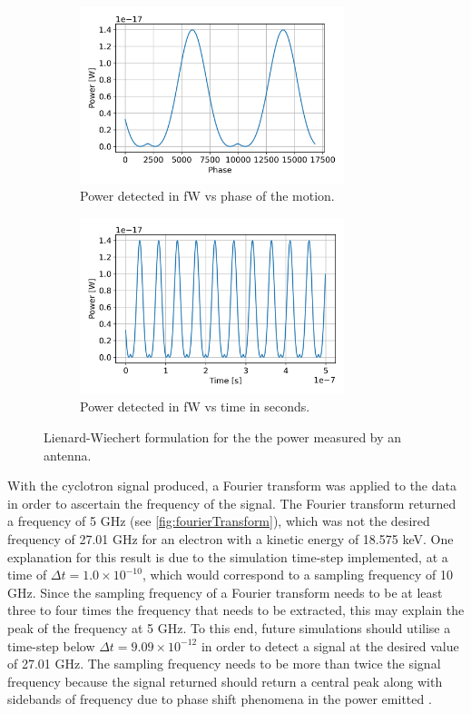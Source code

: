 \documentclass[a4paper,12pt, notitlepage]{article}
\begin{document}
\begin{figure}
    \centering
    \begin{subfigure}[b]{0.45\textwidth}
        \includegraphics[width=77mm]{pictures/powerVsPhase.png}
        \caption{Power detected in fW vs phase of the motion.}
        \label{fig:powerPlot1}
    \end{subfigure} 
    \quad
    \begin{subfigure}[b]{0.45\textwidth}
        \includegraphics[width=77mm]{pictures/powerVsTime.png}
        \caption{Power detected in fW vs time in seconds.}
        \label{fig:powerPlot2}
    \end{subfigure}
\caption{Lienard-Wiechert formulation for the the power measured by an antenna.}
\label{fig:powerPlots1}
\end{figure}

With the cyclotron signal produced, a Fourier transform was applied to the data in order to ascertain the frequency of the signal. The Fourier transform returned a frequency of 5 GHz (see \cref{fig:fourierTransform}), which was not the desired frequency of 27.01 GHz for an electron with a kinetic energy of 18.575 keV. One explanation for this result is due to the simulation time-step implemented, at a time of $\Delta t = 1.0\times10^{-10}$, which would correspond to a sampling frequency of 10 GHz. Since the sampling frequency of a Fourier transform needs to be at least three to four times the frequency that needs to be extracted, this may explain the peak of the frequency at 5 GHz. To this end, future simulations should utilise a time-step below $\Delta t = 9.09\times10^{-12}$ in order to detect a signal at the desired value of 27.01 GHz. The sampling frequency needs to be more than twice the signal frequency because the signal returned should return a central peak along with sidebands of frequency due to phase shift phenomena in the power emitted \cite{Ashtari2019}.
\end{document}
